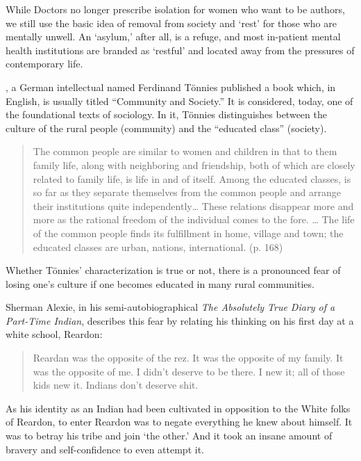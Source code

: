 While Doctors no longer prescribe isolation for women who want to be authors, we still use the basic idea of removal from society and `rest' for those who are mentally unwell. An `asylum,' after all, is a refuge, and most in-patient mental health institutions are branded as `restful' and located away from the pressures of contemporary life. 

, a German intellectual named Ferdinand Tönnies published a book which, in English, is usually titled ``Community and Society.'' It is considered, today, one of the foundational texts of sociology. In it, Tönnies distinguishes between the culture of the rural people (community) and the ``educated class'' (society). 

\begin{quote}

The common people are similar to women and children in that to them family life, along with neighboring and friendship, both of which are closely related to family life, is life in and of itself. Among the educated classes, is so far as they separate themselves from the common people and arrange their institutions quite independently{\ldots} These relations disappear more and more as the rational freedom of the individual comes to the fore. {\ldots} The life of the common people finds its fulfillment in home, village and town; the educated classes are urban, nations, international. (p. 168) 
\end{quote}

Whether Tönnies' characterization is true or not, there is a pronounced fear of losing one's culture if one becomes educated in many rural communities. 

Sherman Alexie, in his semi-autobiographical \emph{The Absolutely True Diary of a Part-Time Indian}, describes this fear by relating his thinking on his first day at a white school, Reardon:

\begin{quote}

Reardan was the opposite of the rez. It was the opposite of my family. It was the opposite of me. I didn't deserve to be there. I new it; all of those kids new it. Indians don't deserve shit.
\end{quote}

As his identity as an Indian had been cultivated in opposition to the White folks of Reardon, to enter Reardon was to negate everything he knew about himself. It was to betray his tribe and join `the other.' And it took an insane amount of bravery and self-confidence to even attempt it.

